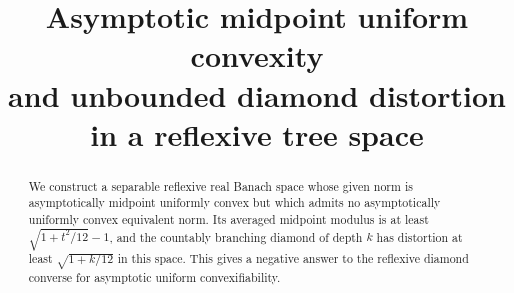 
\title{Asymptotic midpoint uniform convexity\texorpdfstring{\\}{ }and unbounded diamond distortion\texorpdfstring{\\}{ }in a reflexive tree space}

\maketitle
\begin{abstract}
We construct a separable reflexive real Banach space whose given norm
is asymptotically midpoint uniformly convex but which admits no
asymptotically uniformly convex equivalent norm. Its averaged midpoint
modulus is at least $\sqrt{1+t^2/12}-1$, and the countably branching
diamond of depth $k$ has distortion at least $\sqrt{1+k/12}$ in this
space. This gives a negative answer to the reflexive diamond converse
for asymptotic uniform convexifiability.
\end{abstract}






\par
\begingroup
\raggedright


\endgroup

